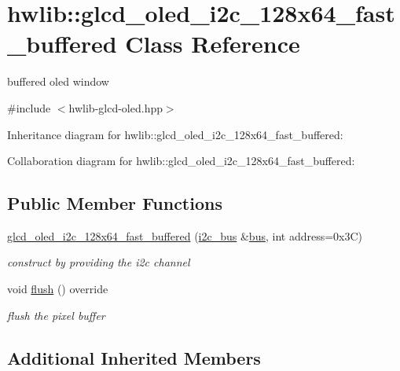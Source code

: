 \hypertarget{classhwlib_1_1glcd__oled__i2c__128x64__fast__buffered}{}\section{hwlib\+:\+:glcd\+\_\+oled\+\_\+i2c\+\_\+128x64\+\_\+fast\+\_\+buffered Class Reference}
\label{classhwlib_1_1glcd__oled__i2c__128x64__fast__buffered}


buffered oled window  




{\ttfamily \#include $<$hwlib-\/glcd-\/oled.\+hpp$>$}



Inheritance diagram for hwlib\+:\+:glcd\+\_\+oled\+\_\+i2c\+\_\+128x64\+\_\+fast\+\_\+buffered\+:


Collaboration diagram for hwlib\+:\+:glcd\+\_\+oled\+\_\+i2c\+\_\+128x64\+\_\+fast\+\_\+buffered\+:
\subsection*{Public Member Functions}
\begin{DoxyCompactItemize}
\item 
\mbox{\label{classhwlib_1_1glcd__oled__i2c__128x64__fast__buffered_ade4ba77416fe498a2ae22e68024de8e6}} 
\hyperlink{classhwlib_1_1glcd__oled__i2c__128x64__fast__buffered_ade4ba77416fe498a2ae22e68024de8e6}{glcd\+\_\+oled\+\_\+i2c\+\_\+128x64\+\_\+fast\+\_\+buffered} (\hyperlink{classhwlib_1_1i2c__bus}{i2c\+\_\+bus} \&\hyperlink{classhwlib_1_1ssd1306__i2c_a6dd727643c4b270cc364cd6e00ec84e9}{bus}, int address=0x3\+C)
\begin{DoxyCompactList}\small\item\em construct by providing the i2c channel \end{DoxyCompactList}\item 
void \hyperlink{classhwlib_1_1glcd__oled__i2c__128x64__fast__buffered_a799b9725f8b535d8fe22b18ffd98af8e}{flush} () override
\begin{DoxyCompactList}\small\item\em flush the pixel buffer \end{DoxyCompactList}\end{DoxyCompactItemize}
\subsection*{Additional Inherited Members}


